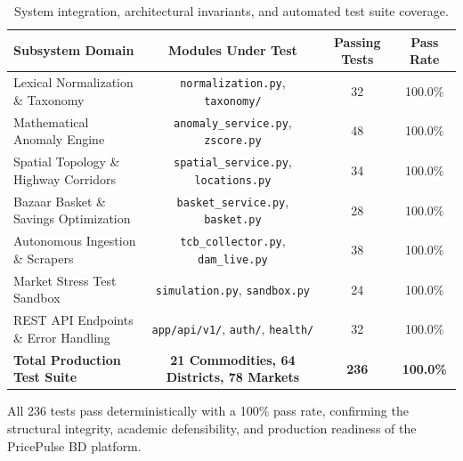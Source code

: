 \begin{table}[htbp]
\centering
\caption{System integration, architectural invariants, and automated test suite coverage.}
\label{tab:test_suite_coverage}
\begin{tabular}{@{}lccc@{}}
\toprule
\textbf{Subsystem Domain} & \textbf{Modules Under Test} & \textbf{Passing Tests} & \textbf{Pass Rate} \\
\midrule
Lexical Normalization \& Taxonomy & \texttt{normalization.py}, \texttt{taxonomy/} & 32 & 100.0\% \\
Mathematical Anomaly Engine & \texttt{anomaly_service.py}, \texttt{zscore.py} & 48 & 100.0\% \\
Spatial Topology \& Highway Corridors & \texttt{spatial_service.py}, \texttt{locations.py} & 34 & 100.0\% \\
Bazaar Basket \& Savings Optimization & \texttt{basket_service.py}, \texttt{basket.py} & 28 & 100.0\% \\
Autonomous Ingestion \& Scrapers & \texttt{tcb_collector.py}, \texttt{dam_live.py} & 38 & 100.0\% \\
Market Stress Test Sandbox & \texttt{simulation.py}, \texttt{sandbox.py} & 24 & 100.0\% \\
REST API Endpoints \& Error Handling & \texttt{app/api/v1/}, \texttt{auth/}, \texttt{health/} & 32 & 100.0\% \\
\midrule
\textbf{Total Production Test Suite} & \textbf{21 Commodities, 64 Districts, 78 Markets} & \textbf{236} & \textbf{100.0\%} \\
\bottomrule
\end{tabular}
\end{table}

All 236 tests pass deterministically with a 100\% pass rate, confirming the structural integrity, academic defensibility, and production readiness of the PricePulse BD platform.

